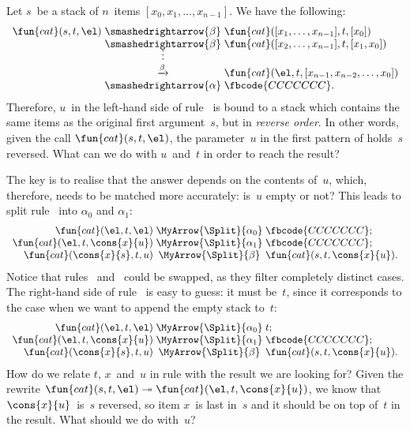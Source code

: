 Let \(s\)~be a stack of \(n\)~items \([x_0,x_1,\dots,x_{n-1}]\). We
have the following:
\begin{equation*}
\begin{array}{r@{\;}c@{\;}l}
\fun{cat}(s,t,\el) & \smashedrightarrow{\beta} &
  \fun{cat}([x\sb{1},\ldots,x\sb{n-1}],t,[x\sb{0}])\\
              & \smashedrightarrow{\beta} &
  \fun{cat}([x\sb{2},\ldots,x\sb{n-1}],t,[x\sb{1},x\sb{0}])\\
              & \smash{\vdots}\\
              & \xrightarrow{\beta} & \fun{cat}(\el,t,[x\sb{n-1},x\sb{n-2},\ldots,x\sb{0}])\\
              & \smashedrightarrow{\alpha} & \fbcode{CCCCCCC}.
\end{array}
\end{equation*}
Therefore, \(u\)~in the left\hyp{}hand side of rule~\clause{\alpha} is
bound to a stack which contains the same items as the original first
argument~\(s\), but in \emph{reverse order}. In other words, given the
call \(\fun{cat}(s,t,\el)\), the parameter~\(u\) in the first pattern
of  holds~\(s\) reversed. What can we do with
\(u\)~and~\(t\) in order to reach the result?

The key is to realise that the answer depends on the contents
of~\(u\), which, therefore, needs to be matched more accurately:
is~\(u\) empty or not? This leads to split rule~\clause{\alpha} into
\(\alpha_0\) and \(\alpha_1\):
\newlength\Split\settowidth{}
\begin{equation*}
\begin{array}{r@{\;}c@{\;}l}
\fun{cat}(\el,t,\el) & \MyArrow{\Split}{\alpha\sb{0}} &
  \fbcode{CCCCCCC};\\
\fun{cat}(\el,t,\cons{x}{u}) & \MyArrow{\Split}{\alpha\sb{1}} &
  \fbcode{CCCCCCC};\\
\fun{cat}(\cons{x}{s},t,u) & \MyArrow{\Split}{\beta} &
 \fun{cat}(s,t,\cons{x}{u}).
\end{array}
\end{equation*}
Notice that rules ~and~ could be
swapped, as they filter completely distinct cases. The right\hyp{}hand
side of rule~ is easy to guess: it must be~\(t\),
since it corresponds to the case when we want to append the empty
stack to~\(t\):
\begin{equation*}
\begin{array}{r@{\;}c@{\;}l}
\fun{cat}(\el,t,\el) & \MyArrow{\Split}{\alpha\sb{0}} & t;\\
\fun{cat}(\el,t,\cons{x}{u}) & \MyArrow{\Split}{\alpha\sb{1}} & \fbcode{CCCCCCC};\\
\fun{cat}(\cons{x}{s},t,u) & \MyArrow{\Split}{\beta} &
  \fun{cat}(s,t,\cons{x}{u}).
\end{array}
\end{equation*}
How do we relate \(t\), \(x\)~and~\(u\) in rule  with
the result we are looking for? Given the rewrite \(\fun{cat}(s,t,\el)
\twoheadrightarrow \fun{cat}(\el,t,\cons{x}{u})\), we know that
\(\cons{x}{u}\)~is~\(s\) reversed, so item \(x\)~is last in~\(s\) and
it should be on top of~\(t\) in the result. What should we do
with~\(u\)?


